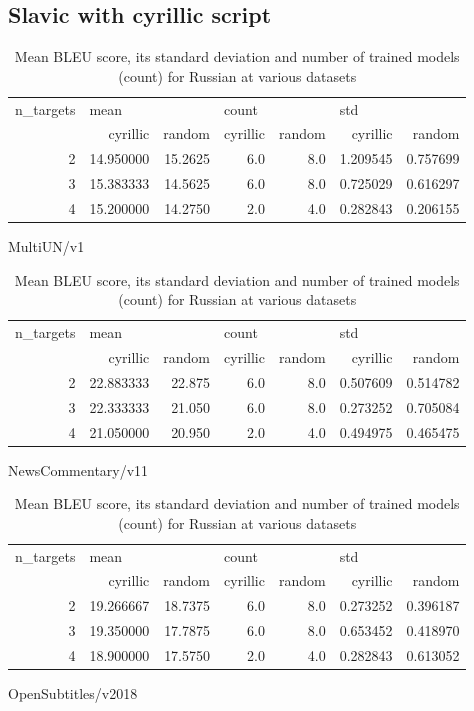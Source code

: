 \subsection{Slavic with cyrillic script}

\begin{table}[h]
\begin{subtable}[t]{1\linewidth}
\begin{tabular}{rrrrrrr}
\toprule
n\_targets & \multicolumn{2}{l}{mean} & \multicolumn{2}{l}{count} & \multicolumn{2}{l}{std} \\
          &   cyrillic &   random & cyrillic & random &  cyrillic &    random \\
\midrule
        2 &  14.950000 &  15.2625 &      6.0 &    8.0 &  1.209545 &  0.757699 \\
        3 &  15.383333 &  14.5625 &      6.0 &    8.0 &  0.725029 &  0.616297 \\
        4 &  15.200000 &  14.2750 &      2.0 &    4.0 &  0.282843 &  0.206155 \\
\bottomrule
\end{tabular}
\caption{MultiUN/v1}
\label{table:ru/multi_un}
\end{subtable}
\begin{subtable}[t]{1\linewidth}
\begin{tabular}{rrrrrrr}
\toprule
n\_targets & \multicolumn{2}{l}{mean} & \multicolumn{2}{l}{count} & \multicolumn{2}{l}{std} \\
          &   cyrillic &  random & cyrillic & random &  cyrillic &    random \\
\midrule
        2 &  22.883333 &  22.875 &      6.0 &    8.0 &  0.507609 &  0.514782 \\
        3 &  22.333333 &  21.050 &      6.0 &    8.0 &  0.273252 &  0.705084 \\
        4 &  21.050000 &  20.950 &      2.0 &    4.0 &  0.494975 &  0.465475 \\
\bottomrule
\end{tabular}
\caption{NewsCommentary/v11}
\label{table:ru/news_v11}
\end{subtable}
\begin{subtable}[t]{1\linewidth}
\begin{tabular}{rrrrrrr}
\toprule
n\_targets & \multicolumn{2}{l}{mean} & \multicolumn{2}{l}{count} & \multicolumn{2}{l}{std} \\
          &   cyrillic &   random & cyrillic & random &  cyrillic &    random \\
\midrule
        2 &  19.266667 &  18.7375 &      6.0 &    8.0 &  0.273252 &  0.396187 \\
        3 &  19.350000 &  17.7875 &      6.0 &    8.0 &  0.653452 &  0.418970 \\
        4 &  18.900000 &  17.5750 &      2.0 &    4.0 &  0.282843 &  0.613052 \\
\bottomrule
\end{tabular}
\caption{OpenSubtitles/v2018}
\label{table:ru/news_v11}
\end{subtable}
\caption{Mean BLEU score, its standard deviation and number of trained models (count) for Russian at various datasets}
\end{table}



